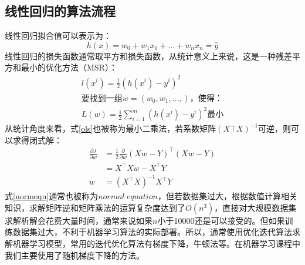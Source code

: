 \documentclass[twoside]{article}
\begin{document}
\subsection*{线性回归的算法流程}
线性回归拟合值可以表示为：
\begin{equation*}
    h(x)=w_0+w_1x_1+\ldots+w_nx_n=\hat{y}
\end{equation*}
线性回归的损失函数通常取平方和损失函数，从统计意义上来说，这是一种残差平方和最小的优化方法（MSR）：
\begin{equation}
    \label{ols}
    \begin{aligned}
        l(x^i)=\frac{1}{2}\left(h(x^i)-y^i\right)^2\\
        \text{要找到一组}w=(w_0,w_1,\ldots,)，使得：\\
        L(w)=\frac{1}{2}\sum_{i=1}^m (h(x^i)-y^i)^2\text{最小}
    \end{aligned}
\end{equation}
从统计角度来看，式\ref{ols}也被称为最小二乘法，若系数矩阵$(X\top X)^{-1}$可逆，则可以求得闭式解：
\begin{equation}\label{normequ}\begin{aligned}
    \frac{\partial J}{\partial w}&=\frac{1}{2} \frac{\partial}{\partial w}(Xw-Y)^\top(Xw-Y)\\ &=X^\top Xw-X^\top Y\\
    w&=(X^\top X)^{-1} X^\top Y
\end{aligned}
\end{equation}
式\ref{normequ}通常也被称为$normal~equation $，但若数据集过大，根据数值计算相关知识，求解矩阵逆和矩阵乘法的运算复杂度达到了$O(n^3)$，直接对大规模数据集求解析解会花费大量时间，通常来说如果$n$小于10000还是可以接受的。但如果训练数据集过大，不利于机器学习算法的实际部署。所以，通常使用优化迭代算法求解机器学习模型，常用的迭代优化算法有梯度下降，牛顿法等。在机器学习课程中我们主要使用了随机梯度下降的方法。
\end{document}

